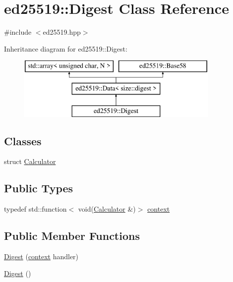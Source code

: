 \hypertarget{classed25519_1_1_digest}{}\section{ed25519\+::Digest Class Reference}
\label{classed25519_1_1_digest}


{\ttfamily \#include $<$ed25519.\+hpp$>$}

Inheritance diagram for ed25519\+::Digest\+:\begin{figure}[H]
\begin{center}
\leavevmode
\includegraphics[height=3.000000cm]{classed25519_1_1_digest}
\end{center}
\end{figure}
\subsection*{Classes}
\begin{DoxyCompactItemize}
\item 
struct \mbox{\hyperlink{structed25519_1_1_digest_1_1_calculator}{Calculator}}
\end{DoxyCompactItemize}
\subsection*{Public Types}
\begin{DoxyCompactItemize}
\item 
typedef std\+::function$<$ void(\mbox{\hyperlink{structed25519_1_1_digest_1_1_calculator}{Calculator}} \&)$>$ \mbox{\hyperlink{classed25519_1_1_digest_ae086cdedc0e704dd1d869138648b2d1a}{context}}
\end{DoxyCompactItemize}
\subsection*{Public Member Functions}
\begin{DoxyCompactItemize}
\item 
\mbox{\hyperlink{classed25519_1_1_digest_a18beea9fca7dd58df55300dd5e53420d}{Digest}} (\mbox{\hyperlink{classed25519_1_1_digest_ae086cdedc0e704dd1d869138648b2d1a}{context}} handler)
\item 
\mbox{\hyperlink{classed25519_1_1_digest_a032b74cccbe09b962b0d148ce6fa9eaa}{Digest}} ()
\end{DoxyCompactItemize}
